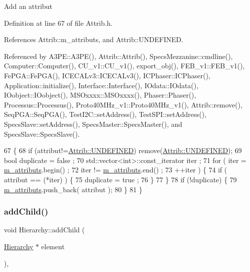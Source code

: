 Add an attribut 

Definition at line 67 of file Attrib.\+h.



References Attrib\+::m\+\_\+attributs, and Attrib\+::\+U\+N\+D\+E\+F\+I\+N\+ED.



Referenced by A3\+P\+E\+::\+A3\+P\+E(), Attrib\+::\+Attrib(), Specs\+Mezzanine\+::cmdline(), Computer\+::\+Computer(), C\+U\+\_\+v1\+::\+C\+U\+\_\+v1(), export\+\_\+obj(), F\+E\+B\+\_\+v1\+::\+F\+E\+B\+\_\+v1(), Fe\+P\+G\+A\+::\+Fe\+P\+G\+A(), I\+C\+E\+C\+A\+Lv3\+::\+I\+C\+E\+C\+A\+Lv3(), I\+C\+Phaser\+::\+I\+C\+Phaser(), Application\+::initialize(), Interface\+::\+Interface(), I\+Odata\+::\+I\+Odata(), I\+Oobject\+::\+I\+Oobject(), M\+S\+Oxxxx\+::\+M\+S\+Oxxxx(), Phaser\+::\+Phaser(), Processus\+::\+Processus(), Proto40\+M\+Hz\+\_\+v1\+::\+Proto40\+M\+Hz\+\_\+v1(), Attrib\+::remove(), Seq\+P\+G\+A\+::\+Seq\+P\+G\+A(), Test\+I2\+C\+::set\+Address(), Test\+S\+P\+I\+::set\+Address(), Specs\+Slave\+::set\+Address(), Specs\+Master\+::\+Specs\+Master(), and Specs\+Slave\+::\+Specs\+Slave().


\begin{DoxyCode}
67                             \{
68     \textcolor{keywordflow}{if} (attribut!=\hyperlink{classAttrib_a69e171d7cc6417835a5a306d3c764235a3a8da2ab97dda18aebab196fe4100531}{Attrib::UNDEFINED}) \textcolor{keyword}{remove}(\hyperlink{classAttrib_a69e171d7cc6417835a5a306d3c764235a3a8da2ab97dda18aebab196fe4100531}{Attrib::UNDEFINED});
69     \textcolor{keywordtype}{bool} duplicate = false ;
70     std::vector<int>::const\_iterator iter ;
71     \textcolor{keywordflow}{for} ( iter  = \hyperlink{classAttrib_ac4bd58a0cc6b38a3b711d609a3d3aacc}{m\_attributs}.begin() ;
72           iter != \hyperlink{classAttrib_ac4bd58a0cc6b38a3b711d609a3d3aacc}{m\_attributs}.end()   ;
73           ++iter ) \{
74       \textcolor{keywordflow}{if} ( attribut == (*iter) ) \{
75         duplicate = true ;
76       \}
77     \}
78     \textcolor{keywordflow}{if} (!duplicate) \{
79       \hyperlink{classAttrib_ac4bd58a0cc6b38a3b711d609a3d3aacc}{m\_attributs}.push\_back( attribut );
80     \}
81   \}
\end{DoxyCode}
\mbox{\label{classHierarchy_ad677774ff38fcb257c04a3a10d471fac}} 
\subsubsection{\texorpdfstring{add\+Child()}{addChild()}}
{\footnotesize\ttfamily void Hierarchy\+::add\+Child (\begin{DoxyParamCaption}\item[{\hyperlink{classHierarchy}{Hierarchy} $\ast$}]{element }\end{DoxyParamCaption})\hspace{0.3cm}{\ttfamily [virtual]}, {\ttfamily [inherited]}}



